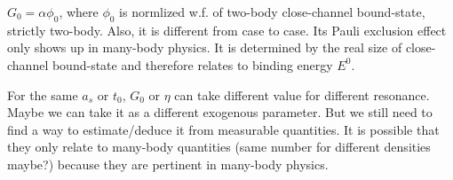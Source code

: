 $G_0=\alpha\phi_0$, where $\phi_0$ is normlized w.f. of two-body close-channel bound-state, strictly two-body.  Also, it is different from case to case. Its Pauli exclusion effect only shows up in many-body physics. It is determined by the real size of close-channel bound-state and therefore relates to binding energy $E^0$.  

For the same $a_s$ or $t_0$, $G_0$ or $\eta$ can take different value for different resonance.  Maybe we can take it as a different exogenous parameter. But we still need to find a way to estimate/deduce it from measurable quantities.  It is possible that they only relate to many-body quantities (same number for different densities maybe?)  because they are pertinent in many-body physics.